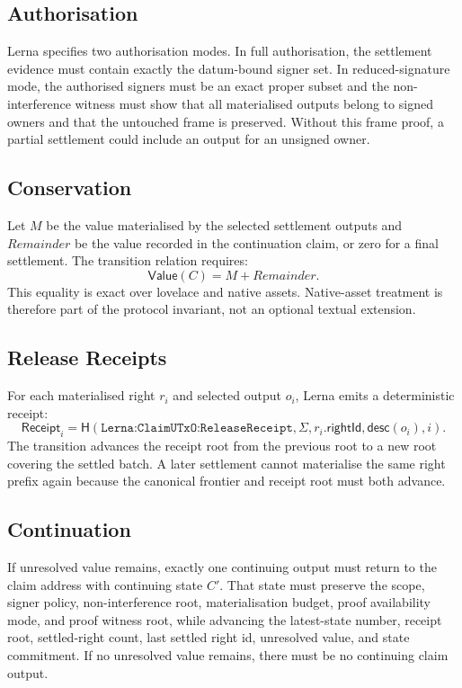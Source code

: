 \documentclass[a4paper,11pt]{article}
\theoremstyle{definition}
\theoremstyle{plain}
\theoremstyle{remark}
\newcommand{\hash}{\mathsf{H}}
\newcommand{\Value}{\mathsf{Value}}
\newcommand{\Receipt}{\mathsf{Receipt}}
\begin{document}
\subsection{Authorisation}
\label{sec:authorisation}

Lerna specifies two authorisation modes. In full authorisation, the settlement
evidence must contain exactly the datum-bound signer set. In reduced-signature
mode, the authorised signers must be an exact proper subset and the
non-interference witness must show that all materialised outputs belong to
signed owners and that the untouched frame is preserved. Without this frame
proof, a partial settlement could include an output for an unsigned owner.

\subsection{Conservation}
\label{sec:conservation}

Let \(M\) be the value materialised by the selected settlement outputs and
\(Remainder\) be the value recorded in the continuation claim, or zero for a
final settlement. The transition relation requires:
\[
  \Value(C) = M + Remainder.
\]
This equality is exact over lovelace and native assets. Native-asset treatment
is therefore part of the protocol invariant, not an optional textual extension.

\subsection{Release Receipts}
\label{sec:release-receipts}

For each materialised right \(r_i\) and selected output \(o_i\), Lerna emits a
deterministic receipt:
\[
\Receipt_i=\hash(\texttt{Lerna:ClaimUTxO:ReleaseReceipt},
  \Sigma, r_i.\mathsf{rightId}, \mathsf{desc}(o_i), i).
\]
The transition advances the receipt root from the previous root to a new root
covering the settled batch. A later settlement cannot materialise the same
right prefix again because the canonical frontier and receipt root must both
advance.

\subsection{Continuation}
\label{sec:continuation}

If unresolved value remains, exactly one continuing output must return to the
claim address with continuing state \(C'\). That state must preserve the
scope, signer policy, non-interference root, materialisation budget, proof
availability mode, and proof witness root, while advancing the latest-state
number, receipt root, settled-right count, last settled right id, unresolved
value, and state commitment. If no unresolved value remains, there must be no
continuing claim output.
\end{document}
